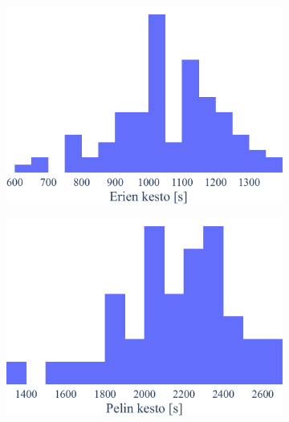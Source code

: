     \begin{figure}[!ht]
       \centering
       \begin{subfigure}[b]{0.4\textwidth}
           \centering
           \includegraphics[width=\textwidth]{figures/pelit1.pdf}
       \end{subfigure}
       \hfill
       \begin{subfigure}[b]{0.4\textwidth}
           \centering
           \includegraphics[width=\textwidth]{figures/pelit2.pdf}
       \end{subfigure}
       \vspace{\baselineskip}
       \begin{subfigure}[b]{0.4\textwidth}
           \centering

\end{subfigure}
\end{figure}

